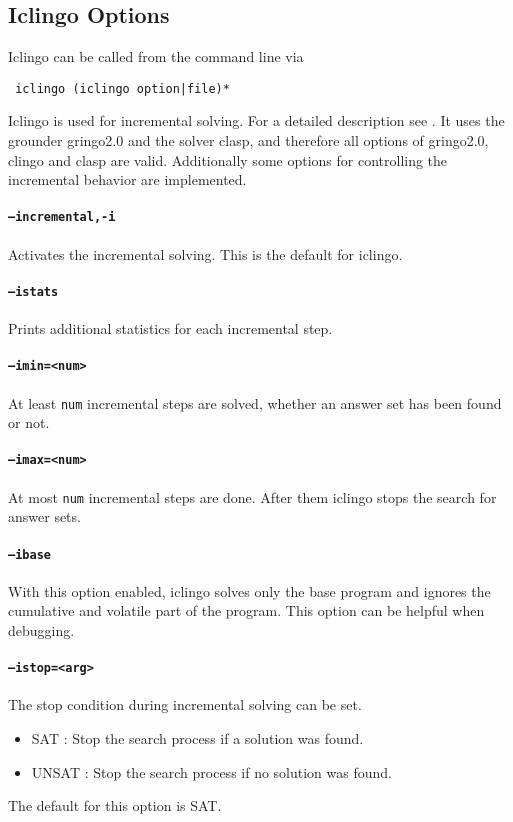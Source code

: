 \documentclass[a4paper,10pt]{article}
\begin{document}
\subsection{Iclingo Options}
Iclingo can be called from the command line via
\begin{verbatim}
 iclingo (iclingo option|file)*
\end{verbatim}
Iclingo is used for incremental solving. For a detailed description see \cite{gekaosscth08a}.
It uses the grounder gringo2.0 and the solver clasp, and therefore all options of gringo2.0, clingo and clasp are valid.
Additionally some options for controlling the incremental behavior are implemented.
\paragraph{\texttt{--incremental,-i}}
Activates the incremental solving. This is the default for iclingo.
\paragraph{\texttt{--istats}}
Prints additional statistics for each incremental step.
\paragraph{\texttt{--imin=<num>}}
At least \texttt{num} incremental steps are solved, whether an answer set has been found or not.
\paragraph{\texttt{--imax=<num>}}
At most \texttt{num} incremental steps are done. After them iclingo stops the search for answer sets.
\paragraph{\texttt{--ibase}}
With this option enabled, iclingo solves only the base program and ignores the cumulative and volatile part of the program.
This option can be helpful when debugging.
\paragraph{\texttt{--istop=<arg>}}
The stop condition during incremental solving can be set.
\begin{itemize}
 \item SAT    : Stop the search process if a solution was found.
 \item UNSAT  : Stop the search process if no solution was found.
\end{itemize}
The default for this option is SAT.
\end{document}
